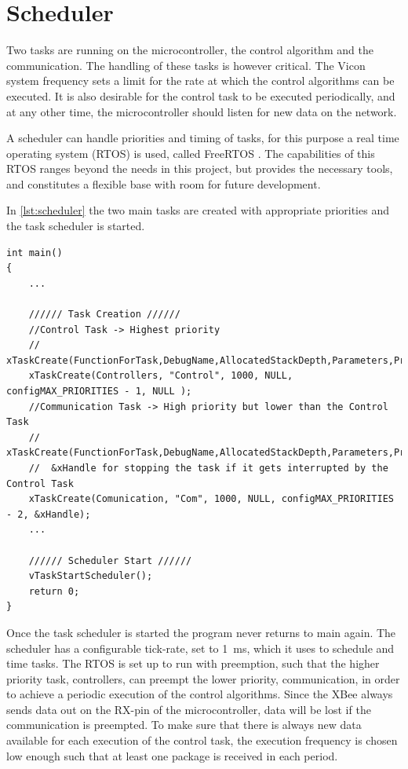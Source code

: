 \section{Scheduler}\label{sec:Scheduler}
Two tasks are running on the microcontroller, the control algorithm and the communication. The handling of these tasks is however critical. The Vicon system frequency sets a limit for the rate at which the control algorithms can be executed. It is also desirable for the control task to be executed periodically, and at any other time, the microcontroller should listen for new data on the network.

A scheduler can handle priorities and timing of tasks, for this purpose a real time operating system (RTOS) is used, called FreeRTOS \cite{freeRtos}. The capabilities of this RTOS ranges beyond the needs in this project, but provides the necessary tools, and constitutes a flexible base with room for future development.

In \autoref{lst:scheduler} the two main tasks are created with appropriate priorities and the task scheduler is started.

\begin{lstlisting}[style=customcpp,
                    caption={Code for initialization, creation of the different tasks, start sequence for the motors and call to the scheduler.}, 
                    label=lst:scheduler]
int main()
{
    ... 
    
    ////// Task Creation //////
    //Control Task -> Highest priority
	// xTaskCreate(FunctionForTask,DebugName,AllocatedStackDepth,Parameters,Priority,TaskHandle)
    xTaskCreate(Controllers, "Control", 1000, NULL, configMAX_PRIORITIES - 1, NULL );
    //Communication Task -> High priority but lower than the Control Task
    // xTaskCreate(FunctionForTask,DebugName,AllocatedStackDepth,Parameters,Priority,TaskHandle)
	//	&xHandle for stopping the task if it gets interrupted by the Control Task
    xTaskCreate(Comunication, "Com", 1000, NULL, configMAX_PRIORITIES - 2, &xHandle);
    ...

    ////// Scheduler Start //////
    vTaskStartScheduler();
    return 0;
}
\end{lstlisting}

Once the task scheduler is started the program never returns to main again. The scheduler has a configurable tick-rate, set to \SI{1}{ms}, which it uses to schedule and time tasks. The RTOS is set up to run with preemption, such that the higher priority task, controllers, can preempt the lower priority, communication, in order to achieve a periodic execution of the control algorithms. Since the XBee always sends data out on the RX-pin of the microcontroller, data will be lost if the communication is preempted. To make sure that there is always new data available for each execution of the control task, the execution frequency is chosen low enough such that at least one package is received in each period.

